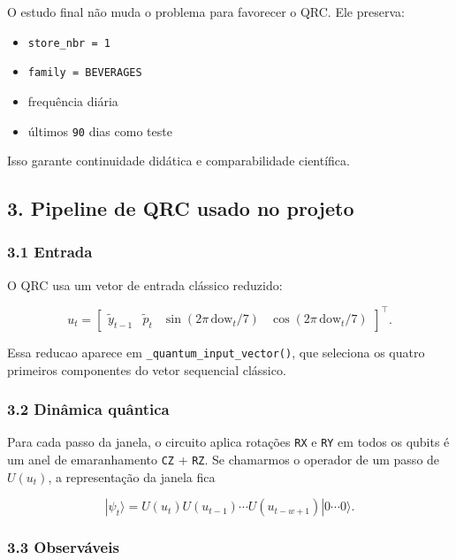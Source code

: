 \documentclass[12pt]{article}
\providecommand{\tightlist}{%
          \setlength{\itemsep}{0pt}\setlength{\parskip}{0pt}}
\begin{document}
O estudo final não muda o problema para favorecer o QRC. Ele preserva:

\begin{itemize}
\tightlist
\item
  \texttt{store\_nbr\ =\ 1}
\item
  \texttt{family\ =\ BEVERAGES}
\item
  frequência diária
\item
  últimos \texttt{90} dias como teste
\end{itemize}

Isso garante continuidade didática e comparabilidade científica.

\subsection{3. Pipeline de QRC usado no projeto}\label{3-pipeline-de-qrc-usado-no-projeto}

\subsubsection{3.1 Entrada}\label{31-entrada}

O QRC usa um vetor de entrada clássico reduzido:

\[
u_t =
\begin{bmatrix}
\widetilde{y}_{t-1} &
\widetilde{p}_t &
\sin(2\pi \, \mathrm{dow}_t / 7) &
\cos(2\pi \, \mathrm{dow}_t / 7)
\end{bmatrix}^\top.
\]

Essa reducao aparece em \texttt{\_quantum\_input\_vector()}, que seleciona os quatro primeiros componentes do vetor sequencial clássico.

\subsubsection{3.2 Dinâmica quântica}\label{32-dinuxe2mica-quuxe2ntica}

Para cada passo da janela, o circuito aplica rotações \texttt{RX} e \texttt{RY} em todos os qubits é um anel de emaranhamento \texttt{CZ} + \texttt{RZ}. Se chamarmos o operador de um passo de \(U(u_t)\), a representação da janela fica

\[
|\psi_t\rangle = U(u_t) U(u_{t-1}) \cdots U(u_{t-w+1}) |0 \cdots 0\rangle.
\]

\subsubsection{3.3 Observáveis}\label{33-observuxe1veis}
\end{document}
